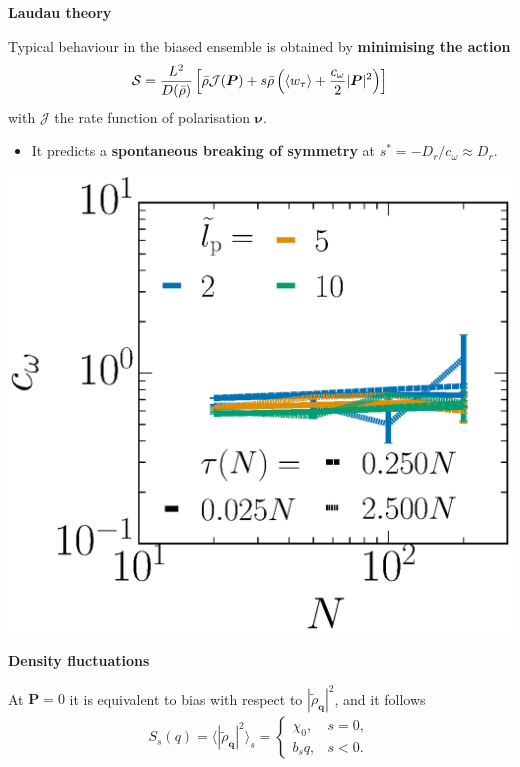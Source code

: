 \documentclass[25pt, a0paper, portrait, innermargin=1.0cm, blockverticalspace=-5mm]{tikzposter}
\renewcommand\paragraph[1]{
\begin{center}
  {\bf\color{CaRed} #1}
\end{center}}
\begin{document}
\begin{columns}
{\begin{multicols}{2}
\paragraph{Laudau theory}

Typical behaviour in the biased ensemble is obtained by \textbf{minimising the action}
\begin{align*}
{\cal S} = \frac{L^2}{D(\bar{\rho})} \left[ \bar\rho {\cal J}(\bm{P}) + s \bar\rho \left( \langle w_\tau\rangle + \frac{c_\omega}{2} | \bm{P} |^2 \right)\right]
\end{align*}
with $\mathcal{J}$ the rate function of polarisation $\bm{\nu}$.\\

\begin{itemize}
  \item It predicts a \textbf{spontaneous breaking of symmetry} at $s^* = -D_r/c_{\omega} \approx D_r$.\\
\end{itemize}

{
\centering
\includegraphics[width=0.8\linewidth]{covPW_Dk6500.eps}
}

\columnbreak
\paragraph{Density fluctuations}

At $\bm{P} = 0$ it is equivalent to bias with respect to $|\tilde{\rho}_{\bm{q}}|^2$, and it follows
\begin{align*}
S_s(q) = \langle|\tilde{\rho}_{\bm{q}}|^2\rangle_s = \begin{cases} \chi_0, &s=0, \\ b_s q, &s < 0. \end{cases}\\
\end{align*}


\end{multicols}}
\end{columns}
\end{document}
